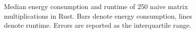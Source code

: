 \documentclass[runningheads]{llncs}
\begin{document}
\begin{figure}[!t]
  \centering
  \tiny
  \begin{subfigure}{.333\linewidth}
  \end{subfigure}%
  \begin{subfigure}{.333\linewidth}
  \end{subfigure}%
  \begin{subfigure}{.333\linewidth}
  \end{subfigure}%
  \caption{Median energy consumption and runtime of 250 naive matrix multiplications in Rust.
  Bars denote energy consumption, lines denote runtime.
  Errors are reported as the interquartile range.}%
  \label{fig:rust}
\end{figure}
\end{document}
